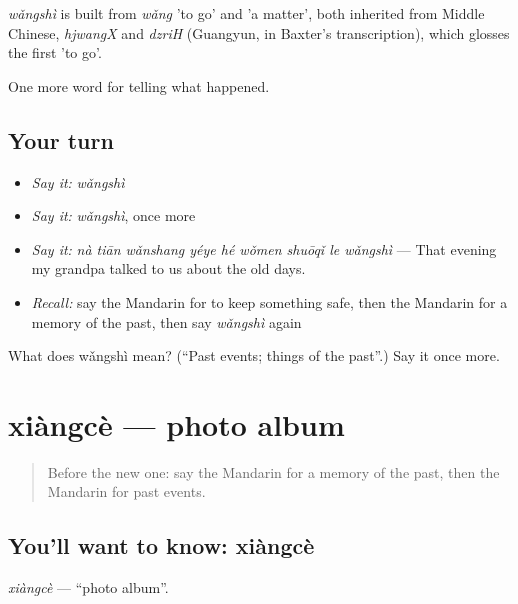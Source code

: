 \begin{cousinweb}
\emph{wǎngshì} is built from \emph{wǎng} 'to go' and  'a matter', both inherited from Middle Chinese, \emph{hjwangX} and \emph{dzriH} (Guangyun, in Baxter's transcription), which glosses the first 'to go'.
\end{cousinweb}

\begin{grammarlens}[title={What you've built}]
One more word for telling what happened.
\end{grammarlens}

\subsection*{Your turn}
\begin{itemize}
\raggedright
  \item \emph{Say it:} \emph{wǎngshì}
  \item \emph{Say it:} \emph{wǎngshì}, once more
  \item \emph{Say it:} \emph{nà tiān wǎnshang yéye hé wǒmen shuōqǐ le wǎngshì} — That evening my grandpa talked to us about the old days.
  \item \emph{Recall:} say the Mandarin for to keep something safe, then the Mandarin for a memory of the past, then say \emph{wǎngshì} again
\end{itemize}

\begin{tcolorbox}[breakable,colback=teal!4,colframe=teal!35!black,title={Before you move on}]
What does wǎngshì mean? (\textquotedblleft{}Past events; things of the past\textquotedblright{}.) Say it once more.
\end{tcolorbox}
\section[xiàngcè]{xiàngcè — photo album}

\label{lesson:ZH-C344-xiangce}



\begin{quote}
Before the new one: say the Mandarin for a memory of the past, then the Mandarin for past events.
\end{quote}

\subsection*{You'll want to know: xiàngcè}
\emph{xiàngcè} — \textquotedblleft{}photo album\textquotedblright{}.

